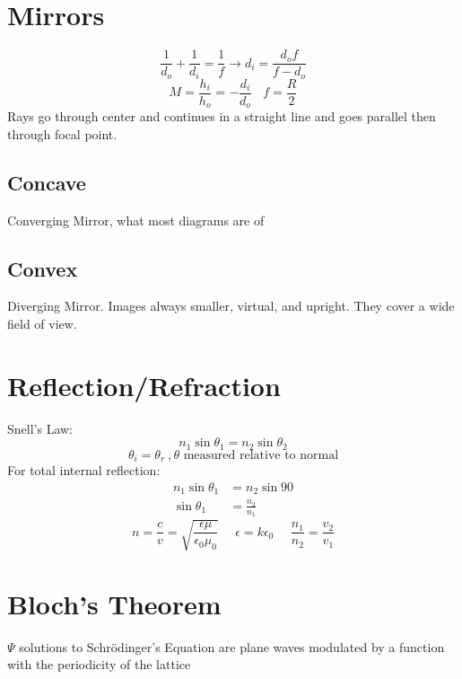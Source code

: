 \documentclass[10pt,a4paper]{article}
\begin{document}
\section{Mirrors} %
\label{sec:mirrors}
\begin{equation}
    \frac{1}{d_o} + \frac{1}{d_i} = \frac{1}{f} \rightarrow d_i = \frac{d_o f}{f - d_o}
\end{equation}
\begin{equation}
    M = \frac{h_i}{h_o} = -\frac{d_i}{d_o}~~~~ f = \frac{R}{2}
\end{equation}
Rays go through center and continues in a straight line and goes parallel then through focal point.
\subsection{Concave} %
\label{sub:concave}
Converging Mirror, what most diagrams are of
\subsection{Convex} %
\label{sub:convex}
Diverging Mirror. Images always smaller, virtual, and upright. They cover a wide field of view.

\section{Reflection/Refraction} %
\label{sec:reflection_rrefraction}
Snell's Law:
\begin{equation}
    n_1 \sin \theta_1 = n_2 \sin \theta_2
\end{equation}
\begin{equation}
    \theta_i = \theta_r~, \theta \textrm{ measured relative to normal}
\end{equation}
For total internal reflection:
\begin{align}
    n_1 \sin \theta_1 &= n_2 \sin 90\\
    \sin \theta_1 &= \frac{n_2}{n_1}
\end{align}
\begin{equation}
    n = \frac{c}{v} = \sqrt{\frac{\epsilon \mu}{\epsilon_0 \mu_0} } ~~~~~~ \epsilon = k \epsilon_0 ~~~~~~ \frac{n_1}{n_2} = \frac{v_2}{v_1}
\end{equation}

\section{Bloch's Theorem} %
\label{sec:bloch_s_theorem}
$\Psi$ solutions to Schr\"odinger's Equation are plane waves modulated by a function with the periodicity of the lattice
\end{document}
